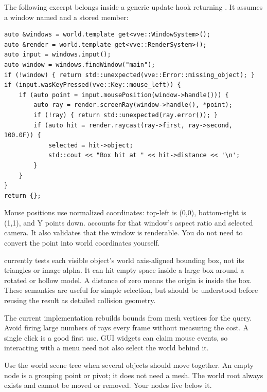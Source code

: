 \documentclass[11pt,a4paper]{article}
\begin{document}
The following excerpt belongs inside a generic update hook returning . It assumes a window named  and a stored  member:
\begin{lstlisting}
auto &windows = world.template get<vve::WindowSystem>();
auto &render = world.template get<vve::RenderSystem>();
auto input = windows.input();
auto window = windows.findWindow("main");
if (!window) { return std::unexpected(vve::Error::missing_object); }
if (input.wasKeyPressed(vve::Key::mouse_left)) {
    if (auto point = input.mousePosition(window->handle())) {
        auto ray = render.screenRay(window->handle(), *point);
        if (!ray) { return std::unexpected(ray.error()); }
        if (auto hit = render.raycast(ray->first, ray->second, 100.0F)) {
            selected = hit->object;
            std::cout << "Box hit at " << hit->distance << '\n';
        }
    }
}
return {};
\end{lstlisting}
Mouse positions use normalized coordinates: top-left is (0,0), bottom-right is (1,1), and Y points down.  accounts for that window's aspect ratio and selected camera. It also validates that the window is renderable. You do not need to convert the point into world coordinates yourself.

 currently tests each visible object's world axis-aligned bounding box, not its triangles or image alpha. It can hit empty space inside a large box around a rotated or hollow model. A distance of zero means the origin is inside the box. These semantics are useful for simple selection, but should be understood before reusing the result as detailed collision geometry.

The current implementation rebuilds bounds from mesh vertices for the query. Avoid firing large numbers of rays every frame without measuring the cost. A single click is a good first use. GUI widgets can claim mouse events, so interacting with a menu need not also select the world behind it.

Use the world scene tree when several objects should move together. An empty node is a grouping point or pivot; it does not need a mesh. The world root always exists and cannot be moved or removed. Your nodes live below it.
\end{document}
